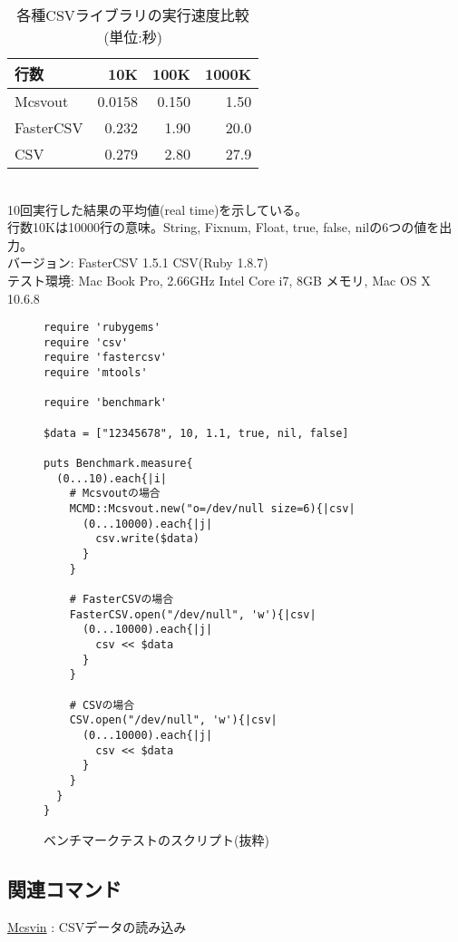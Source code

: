 \begin{table}[htpb]
\begin{center}
\caption{各種CSVライブラリの実行速度比較(単位:秒)\label{tb:mcsvoutRB_bench1}}
\begin{tabular}{l|r|r|r}
\hline
行数      & 10K    & 100K  & 1000K \\ \hline
Mcsvout   & 0.0158 & 0.150 & 1.50  \\
FasterCSV & 0.232  & 1.90  & 20.0  \\
CSV       & 0.279  & 2.80  & 27.9  \\
\hline
\end{tabular}  
{\small
\\10回実行した結果の平均値(real time)を示している。\\
行数10Kは10000行の意味。String, Fixnum, Float, true, false, nilの6つの値を出力。\\
バージョン: FasterCSV 1.5.1 CSV(Ruby 1.8.7) \\
テスト環境: Mac Book Pro, 2.66GHz Intel Core i7, 8GB メモリ, Mac OS X 10.6.8
}
\end{center}
\end{table}  

\begin{figure}[htpb]
\centering
\begin{minipage}{.7\textwidth}
{\small
\begin{Verbatim}[baselinestretch=0.7,frame=single]
require 'rubygems'
require 'csv'
require 'fastercsv'
require 'mtools'

require 'benchmark'

$data = ["12345678", 10, 1.1, true, nil, false]

puts Benchmark.measure{
  (0...10).each{|i|
    # Mcsvoutの場合
    MCMD::Mcsvout.new("o=/dev/null size=6){|csv|
      (0...10000).each{|j|
        csv.write($data)
      }
    }

    # FasterCSVの場合
    FasterCSV.open("/dev/null", 'w'){|csv|
      (0...10000).each{|j|
        csv << $data
      }
    }

    # CSVの場合
    CSV.open("/dev/null", 'w'){|csv|
      (0...10000).each{|j|
        csv << $data
      }
    }
  }
}
\end{Verbatim}
}
\end{minipage}
\caption{ベンチマークテストのスクリプト(抜粋)\label{fig:mcsvoutRB_script}}
\end{figure}


\subsection{関連コマンド}

\hyperref[sect:mcsvinRB]{Mcsvin} : CSVデータの読み込み

